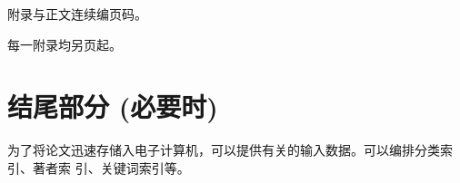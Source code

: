 \documentclass[master]{njuthesis}
\begin{document}
附录与正文连续编页码。

每一附录均另页起。

\section{结尾部分 (必要时)}

为了将论文迅速存储入电子计算机，可以提供有关的输入数据。可以编排分类索引、著者索
引、关键词索引等。

\backmatter


\nocite{*}


%
%
\end{document}
